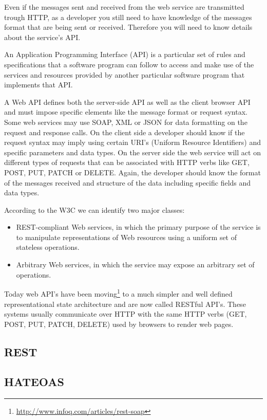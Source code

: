 Even if the messages sent and received from the web service are transmitted trough HTTP, as a developer you still need to have knowledge of the messages format that are being sent or received. Therefore you will need to know details about the service's API.

An Application Programming Interface (API) is a particular
set of rules and specifications that a software program can follow to access and make use of the services
and resources provided by another particular software program that implements that API.

A Web API defines both the server-side API as well as the client browser API and must impose specific elements like the message format or request syntax. Some web services may use SOAP, XML or JSON for data formatting on the request and response calls. On the client side a developer should know if the request syntax may imply using certain URI's (Uniform Resource Identifiers) and specific parameters and data types. On the server side the web service will act on different types of requests that can be associated with HTTP verbs like GET, POST, PUT, PATCH or DELETE. Again, the developer should know the format of the messages received and structure of the data including specific fields and data types.

According to the W3C \cite{W3C} we can identify two major classes:
\begin{itemize}
	\item REST-compliant Web services, in which the primary purpose of the service is to manipulate representations of Web resources using a uniform set of stateless operations.
	\item Arbitrary Web services, in which the service may expose an arbitrary set of operations. 
\end{itemize}

Today web API's have been moving\footnote{\url{http://www.infoq.com/articles/rest-soap}} to a much simpler and well defined representational state architecture and are now called RESTful API's. These systems usually communicate over HTTP with the same HTTP verbs (GET, POST, PUT, PATCH, DELETE) used by browsers to render web pages.

\subsection{REST}
\label{sub-sec:rest}


\subsection{HATEOAS}
\label{sub-sec:hateoas}

